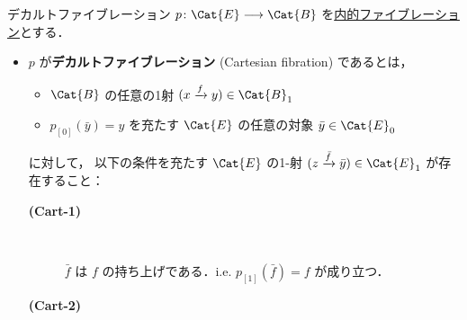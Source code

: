 \documentclass[TQFT_main]{subfiles}
\begin{document}
\begin{mydef}[label=def:Cartesian-fib,breakable]{デカルトファイブレーション}
    $p \colon \Cat{E} \lto \Cat{B}$ を\hyperref[def:infty-1]{内的ファイブレーション}とする．
    \begin{itemize}
        \item $p$ が\textbf{デカルトファイブレーション} (Cartesian fibration) であるとは，
        \begin{itemize}
            \item $\Cat{B}$ の任意の1射 $(x \xrightarrow{f} y) \in \Cat{B}_1$ 
            \item $p_{[0]}(\bar{y}) = y$ を充たす $\Cat{E}$ の任意の対象 $\bar{y} \in \Cat{E}_0$
        \end{itemize}
        に対して，
        以下の条件を充たす $\Cat{E}$ の1-射 $(z \xrightarrow{\bar{f}} \bar{y}) \in \Cat{E}_1$ が存在すること：
        \begin{description}
            \item[\textbf{(Cart-1)}]　
            
            $\bar{f}$ は $f$ の持ち上げである．i.e. $p_{[1]}(\bar{f}) = f$ が成り立つ．

            \item[\textbf{(Cart-2)}]　
            

\end{description}
\end{itemize}
\end{mydef}
\end{document}
